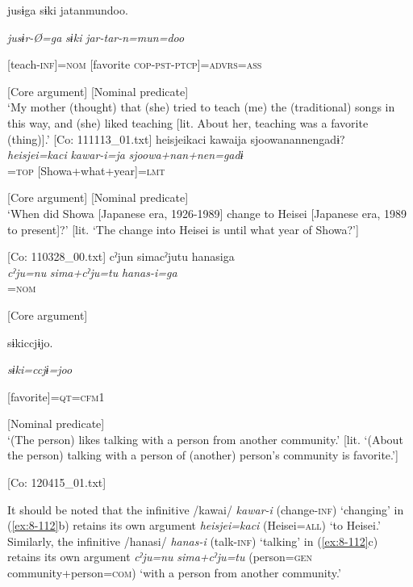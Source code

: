       jusɨga  sɨki  jatanmundoo.

      \textit{jusɨr-Ø=ga}  \textit{sɨki}  \textit{jar-tar-n=mun=doo}

      [teach-\textsc{inf}]=\textsc{nom}  [favorite  \textsc{cop}-\textsc{pst}-\textsc{ptcp}]=\textsc{advrs}=\textsc{ass}

      [Core argument]  [Nominal predicate]\\
\glt ‘My mother (thought) that (she) tried to teach (me) the (traditional) songs in this way, and (she) liked teaching [lit. About her, teaching was a favorite (thing)].’ [Co: 111113\_01.txt]
\ex
{\TM}
\glll  heisjeikaci  kawaija  {\textbar}sjoowanannen{\textbar}gadɨ?\\
\textit{heisjei=kaci}  \textit{kawar-i=ja}  \textit{sjoowa+nan+nen=gadɨ}\\
[Heisei=\textsc{all}  change-\textsc{inf}]=\textsc{top}  [Showa+what+year]=\textsc{lmt}

      [Core argument]  [Nominal predicate]\\
\glt ‘When did Showa [Japanese era, 1926-1989] change to Heisei [Japanese era, 1989 to present]?’ [lit. ‘The change into Heisei is until what year of Showa?’]

      [Co: 110328\_00.txt]
\ex
{\TM}
\glll  cˀjun  simacˀjutu  hanasiga\\
\textit{cˀju=nu}  \textit{sima+cˀju=tu}  \textit{hanas-i=ga}\\
[person=\textsc{gen}  community+person=\textsc{com}  talk-\textsc{inf}]=\textsc{nom}

      [Core argument]  

      sɨkiccjɨjo.

      \textit{sɨki=ccjɨ=joo}

      [favorite]=\textsc{qt}=\textsc{cfm1}

      [Nominal predicate]\\
\glt ‘(The person) likes talking with a person from another community.’ [lit. ‘(About the person) talking with a person of (another) person’s community is favorite.’]

      [Co: 120415\_01.txt]
\z
\z

It should be noted that the infinitive /kawai/ \textit{kawar-i} (change-\textsc{inf}) ‘changing’ in (\ref{ex:8-112}b) retains its own argument \textit{heisjei=kaci} (Heisei=\textsc{all}) ‘to Heisei.’ Similarly, the infinitive /hanasi/ \textit{hanas-i} (talk-\textsc{inf}) ‘talking’ in (\ref{ex:8-112}c) retains its own argument \textit{cˀju=nu} \textit{sima+cˀju=tu} (person=\textsc{gen} community+person=\textsc{com}) ‘with a person from another community.’


